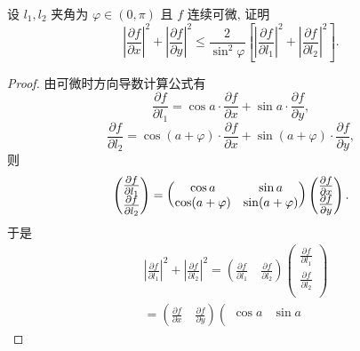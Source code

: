 \documentclass[../../main.tex]{subfiles}%
\begin{document}
\begin{example}
设 \( l_1, l_2 \) 夹角为 \( \varphi \in (0, \pi) \) 且 \( f \) 连续可微, 证明
\[
\left| \frac{\partial f}{\partial x} \right|^2 + \left| \frac{\partial f}{\partial y} \right|^2 \leqslant \frac{2}{\sin^2 \varphi} \left[ \left| \frac{\partial f}{\partial l_1} \right|^2 + \left| \frac{\partial f}{\partial l_2} \right|^2 \right] .
\]
\end{example}
\begin{proof}

由可微时方向导数计算公式有
\[
\frac{\partial f}{\partial l_1} = \cos a \cdot \frac{\partial f}{\partial x} + \sin a \cdot \frac{\partial f}{\partial y},
\]
\[
\frac{\partial f}{\partial l_2} = \cos (a + \varphi) \cdot \frac{\partial f}{\partial x} + \sin (a + \varphi) \cdot \frac{\partial f}{\partial y},
\]
则
\begin{align*}
\begin{large}
\begin{pmatrix}
{\textstyle \frac{\partial f}{\partial l_1} }\\
{\textstyle \frac{\partial f}{\partial l_2}}
\end{pmatrix}
\end{large}
=
\begin{pmatrix}
\cos a & \sin a \\
\cos (a + \varphi) & \sin (a + \varphi)
\end{pmatrix}
\begin{large}
\begin{pmatrix}
{\textstyle \frac{\partial f}{\partial x}} \\
{\textstyle \frac{\partial f}{\partial y}}
\end{pmatrix}
\end{large}.
\end{align*}
于是
\[
\begin{aligned}
&\left| \frac{\partial f}{\partial l_1} \right|^2+\left| \frac{\partial f}{\partial l_2} \right|^2=\left( \frac{\partial f}{\partial l_1}\quad \frac{\partial f}{\partial l_2} \right) \left( \begin{array}{c}
\frac{\partial f}{\partial l_1}\\
\frac{\partial f}{\partial l_2}\\
\end{array} \right) 
\\
&=\left( \frac{\partial f}{\partial x}\quad \frac{\partial f}{\partial y} \right) \left( \begin{matrix}
\cos a&		\sin a\\

\end{matrix}
\end{aligned}\]
\end{proof}
\end{document}

